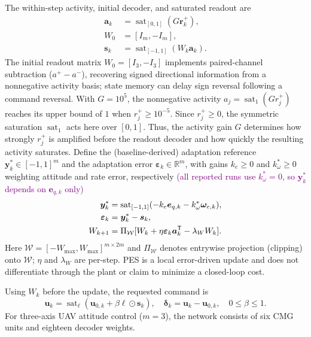 \documentclass[letterpaper, 10 pt, conference]{ieeeconf}
\newcommand{\R}{\mathbb R}
\newcommand{\T}{^{\mathsf T}}
\newcommand{\sat}{\operatorname{sat}}
\begin{document}
The within-step activity, initial decoder, and saturated readout are
\begin{subequations}\label{eq:readout}
\begin{align}
 \bm a_k&=\sat_{[0,1]}(G\bm r_k^+),\label{eq:activity}\\
 W_0&=[I_m,-I_m],\label{eq:decoder_init}\\
 \bm s_k&=\sat_{[-1,1]}(W_k\bm a_k).\label{eq:decoder_output}
\end{align}
\end{subequations}
The initial readout matrix $W_0=[I_3,-I_3]$ implements paired-channel
subtraction ($a^+-a^-$), recovering signed directional information from
a nonnegative activity basis; state memory can delay sign reversal
following a command reversal. With $G=10^5$, the nonnegative activity
$a_j=\sat_{1}(G r_j^+)$ reaches its upper bound of $1$
when $r_j^+\ge10^{-5}$. Since $r_j^+\ge0$, the symmetric
saturation $\sat_{1}$ acts here over $[0,1]$. Thus, the activity
gain $G$ determines how strongly $r_j^+$ is amplified before the
readout decoder and how quickly the resulting activity saturates. Define the (baseline-derived) adaptation reference $\bm y_k^*\in[-1,1]^m$ and the adaptation error $\bm\varepsilon_k\in\R^m$, with gains $k_e\ge0$ and $k_\omega^*\ge0$ weighting attitude and rate error, respectively \textcolor{purple}{(all reported runs use $k_\omega^*=0$, so $\bm y_k^*$ depends on $\bm e_{q,k}$ only)}
\begin{align}
 \bm y_k^*&=\sat_{[-1,1]}(-k_e\bm e_{q,k}-k_\omega^*\textcolor{purple}{\bm\omega_{e,k}}),\\
 \bm\varepsilon_k&=\bm y_k^*-\bm s_k,\\
 W_{k+1}&=\Pi_{\mathcal W}
       [W_k+\eta\bm\varepsilon_k\bm a_k\T-\lambda_W W_k].
 \label{eq:pes}
\end{align}
Here $\mathcal W=[-W_{\max},W_{\max}]^{m\times2m}$ and $\Pi_{\mathcal W}$ denotes entrywise projection (clipping) onto $\mathcal W$; $\eta$ and $\lambda_W$ are per-step. PES is a local error-driven update and does not differentiate through the plant or claim to minimize a closed-loop cost.

Using $W_k$ before the update, the requested command is
\begin{equation}
 \bm u_k=\sat_{\bm\ell}(\bm u_{0,k}+\beta\bm\ell\odot\bm s_k),\quad
 \bm\delta_k=\bm u_k-\bm u_{0,k},\quad 0\le\beta\le1.
 \label{eq:residual}
\end{equation}
For three-axis UAV attitude control ($m=3$), the network consists of
six CMG units and eighteen decoder weights.
\end{document}

